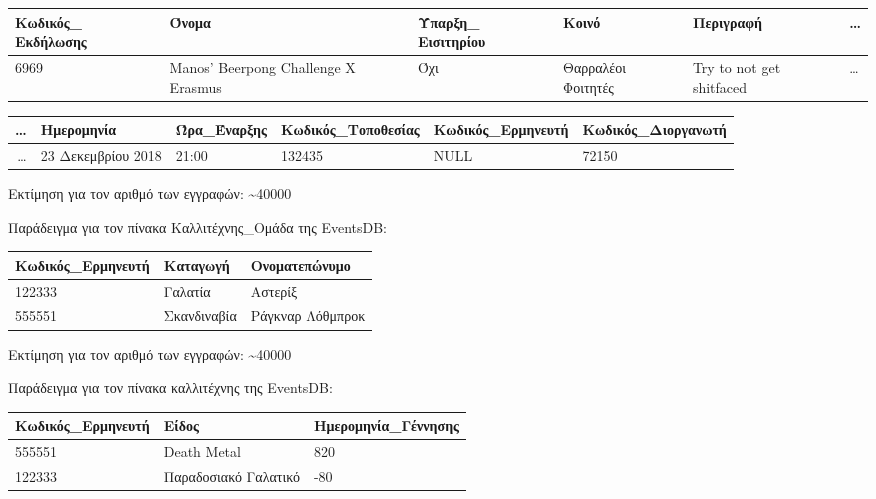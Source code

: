 \begin{table}[H]
  \centering
  \footnotesize
  \begin{tabular}{|p{1.6cm}|p{2.8cm}|p{1.5cm}|l|l|l}
  \hline
  Κωδικός\_ Εκδήλωσης & Όνομα                               
    & Ύπαρξη\_ Εισιτηρίου & Κοινό              & Περιγραφή & \ldots \\ \hline
  6969               & Manos' Beerpong Challenge X Erasmus 
    & Όχι                & Θαρραλέοι Φοιτητές & Try to not get
                                                shitfaced & \ldots  \\ \hline
  \end{tabular}
   \begin{tabular}{r|l|l|l|l|l|}
  \hline
  \ldots & Ημερομηνία         & Ώρα\_Έναρξης & Κωδικός\_Τοποθεσίας & Κωδικός\_Ερμηνευτή & Κωδικός\_Διοργανωτή \\ \hline
  \ldots & 23 Δεκεμβρίου 2018 & 21:00        & 132435              & NULL               & 72150               \\ \hline
\end{tabular}
\end{table}
  
Εκτίμηση για τον αριθμό των εγγραφών: \textasciitilde 40000

Παράδειγμα για τον πίνακα Καλλιτέχνης\_Ομάδα της EventsDB:

\begin{table}[H]
  \centering
  \footnotesize
  \begin{tabular}{|l|l|l|}
  \hline
  Κωδικός\_Ερμηνευτή & Καταγωγή & Ονοματεπώνυμο \\ \hline
  122333 & Γαλατία & Αστερίξ \\ \hline
  555551 & Σκανδιναβία & Ράγκναρ Λόθμπροκ \\ \hline
\end{tabular}
\end{table}
  
Εκτίμηση για τον αριθμό των εγγραφών: \textasciitilde 40000

Παράδειγμα για τον πίνακα καλλιτέχνης της EventsDB:

\begin{table}[H]
  \centering
  \footnotesize
  \begin{tabular}{|l|l|l|}
  \hline
  Κωδικός\_Ερμηνευτή & Είδος & Ημερομηνία\_Γέννησης \\ \hline
  555551 & Death Metal & 820 \\ \hline
  122333 & Παραδοσιακό Γαλατικό & -80 \\ \hline
\end{tabular}
\end{table}
  
